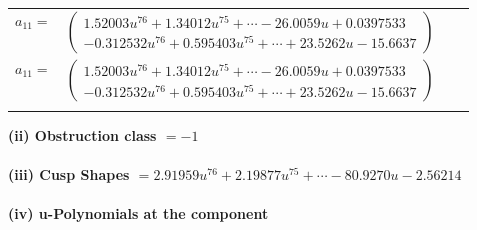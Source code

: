 \documentclass[1p]{elsarticle_modified}
\theoremstyle{definition}
\begin{document}
\begin{tabular}{m{7pt} m{180pt} m{7pt} m{180pt} }
\flushright $a_{11}=$&$\begin{pmatrix}1.52003 u^{76}+1.34012 u^{75}+\cdots-26.0059 u+0.0397533\\-0.312532 u^{76}+0.595403 u^{75}+\cdots+23.5262 u-15.6637\end{pmatrix}$\\ \flushright $a_{11}=$&$\begin{pmatrix}1.52003 u^{76}+1.34012 u^{75}+\cdots-26.0059 u+0.0397533\\-0.312532 u^{76}+0.595403 u^{75}+\cdots+23.5262 u-15.6637\end{pmatrix}$\\&\end{tabular}
\flushleft \textbf{(ii) Obstruction class $= -1$}\\~\\
\flushleft \textbf{(iii) Cusp Shapes $= 2.91959 u^{76}+2.19877 u^{75}+\cdots-80.9270 u-2.56214$}\\~\\
\newpage\renewcommand{\arraystretch}{1}
\flushleft \textbf{(iv) u-Polynomials at the component}\newline \\
\end{document}
